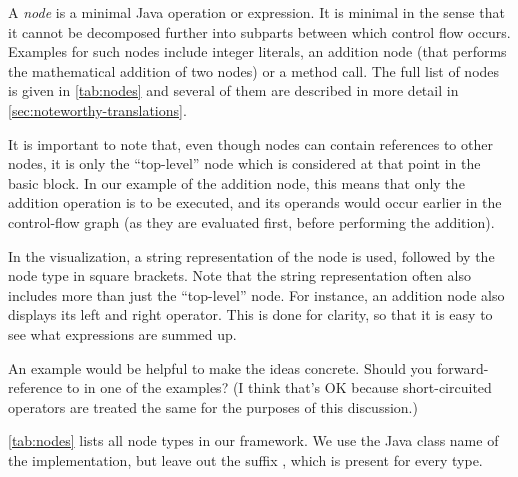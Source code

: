 \begin{definition}[Nodes]
    \label{def:node}
    A \emph{node} is a minimal Java operation or expression.
    It is minimal in the sense that it cannot be decomposed further into subparts
    between which control flow occurs. Examples for such nodes include integer literals,
    an addition node (that performs the mathematical addition of two nodes) or a method call.
    The full list of nodes is given in \autoref{tab:nodes} and several of them
    are described in more detail in \autoref{sec:noteworthy-translations}.
    
    It is important to note that, even though nodes can contain references to other nodes,
    it is only the ``top-level'' node which is considered at that point in the basic
    block. In our example of the addition node, this means that only the addition operation
    is to be executed, and its operands would occur earlier in the control-flow graph
    (as they are evaluated first, before performing the addition).
\end{definition}

In the visualization, a string representation of the node is used, followed by
the node type in square brackets. Note that the string representation often also includes
more than just the ``top-level'' node. For instance, an addition node also displays its
left and right operator. This is done for clarity, so that it is easy to see what
expressions are summed up.

\begin{workinprogress}
  An example would be helpful to make the ideas concrete.  Should you
  forward-reference to \code{||} in one of the examples?  (I think that's
  OK because short-circuited operators are treated the same for the
  purposes of this discussion.)
\end{workinprogress}

\autoref{tab:nodes} lists all node types in our framework. We use the
Java class name of the implementation, but leave out the suffix , which is present
for every type.

